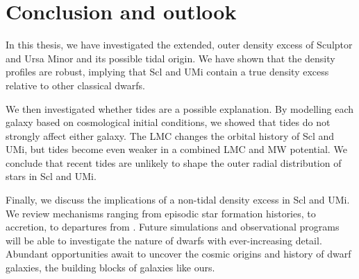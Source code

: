 \section{Conclusion and outlook}\label{conclusion-and-outlook}

In this thesis, we have investigated the extended, outer density excess
of Sculptor and Ursa Minor and its possible tidal origin. We have shown
that the density profiles are robust, implying that Scl and UMi contain
a true density excess relative to other classical dwarfs.

We then investigated whether tides are a possible explanation. By
modelling each galaxy based on cosmological initial conditions, we
showed that tides do not strongly affect either galaxy. The LMC changes
the orbital history of Scl and UMi, but tides become even weaker in a
combined LMC and MW potential. We conclude that recent tides are
unlikely to shape the outer radial distribution of stars in Scl and UMi.

Finally, we discuss the implications of a non-tidal density excess in
Scl and UMi. We review mechanisms ranging from episodic star formation
histories, to accretion, to departures from \LCDM{}. Future simulations
and observational programs will be able to investigate the nature of
dwarfs with ever-increasing detail. Abundant opportunities await to
uncover the cosmic origins and history of dwarf galaxies, the building
blocks of galaxies like ours.
